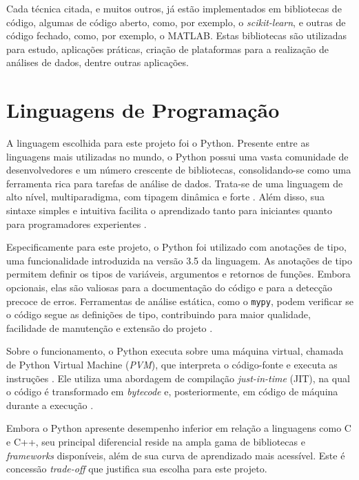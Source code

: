 \setlength{\leftskip}{3cm}

    Cada técnica citada, e muitos outros, já estão implementados em bibliotecas de código, algumas de código aberto, como, por exemplo, o \textit{scikit-learn}, e outras de código fechado, como, por exemplo, o MATLAB. Estas bibliotecas são utilizadas para estudo, aplicações práticas, criação de plataformas para a realização de análises de dados, dentre outras aplicações.

\setlength{\leftskip}{0pt}

\section{Linguagens de Programação}

A linguagem escolhida para este projeto foi o Python. Presente entre as linguagens mais utilizadas no mundo, o Python possui uma vasta comunidade de desenvolvedores e um número crescente de bibliotecas, consolidando-se como uma ferramenta rica para tarefas de análise de dados. Trata-se de uma linguagem de alto nível, multiparadigma, com tipagem dinâmica e forte \citep{python2022}. Além disso, sua sintaxe simples e intuitiva facilita o aprendizado tanto para iniciantes quanto para programadores experientes \citep{van1995python}.

Especificamente para este projeto, o Python foi utilizado com anotações de tipo, uma funcionalidade introduzida na versão 3.5 da linguagem. As anotações de tipo permitem definir os tipos de variáveis, argumentos e retornos de funções. Embora opcionais, elas são valiosas para a documentação do código e para a detecção precoce de erros. Ferramentas de análise estática, como o \texttt{mypy}, podem verificar se o código segue as definições de tipo, contribuindo para maior qualidade, facilidade de manutenção e extensão do projeto \citep{mypy}.

Sobre o funcionamento, o Python executa sobre uma máquina virtual, chamada de Python Virtual Machine (\textit{PVM}), que interpreta o código-fonte e executa as instruções \citep{pvm-2017}. Ele utiliza uma abordagem de compilação \textit{just-in-time} (JIT), na qual o código é transformado em \textit{bytecode} e, posteriormente, em código de máquina durante a execução \citep{pvm-2017}.

Embora o Python apresente desempenho inferior em relação a linguagens como C e C++, seu principal diferencial reside na ampla gama de bibliotecas e \textit{frameworks} disponíveis, além de sua curva de aprendizado mais acessível. Este é concessão \textit{trade-off} que justifica sua escolha para este projeto.

